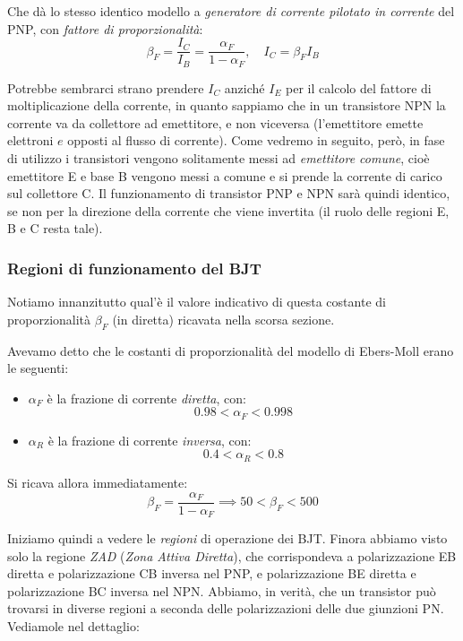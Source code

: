 \documentclass[a4paper,11pt]{article}
\begin{document}
Che dà lo stesso identico modello a \textit{generatore di corrente pilotato in corrente} del PNP, con \textit{fattore di proporzionalità}:
$$
\beta_F = \frac{I_C}{I_B} = \frac{\alpha_F}{1 - \alpha_F}, \quad I_C = \beta_F I_B
$$

Potrebbe sembrarci strano prendere $I_C$ anziché $I_E$ per il calcolo del fattore di moltiplicazione della corrente, in quanto sappiamo che in un transistore NPN la corrente va da collettore ad emettitore, e non viceversa (l'emettitore emette elettroni $e$ opposti al flusso di corrente). Come vedremo in seguito, però, in fase di utilizzo i transistori vengono solitamente messi ad \textit{emettitore comune}, cioè emettitore E e base B vengono messi a comune e si prende la corrente di carico sul collettore C. Il funzionamento di transistor PNP e NPN sarà quindi identico, se non per la direzione della corrente che viene invertita (il ruolo delle regioni E, B e C resta tale). 

\subsubsection{Regioni di funzionamento del BJT}
Notiamo innanzitutto qual'è il valore indicativo di questa costante di proporzionalità $\beta_F$ (in diretta) ricavata nella scorsa sezione. 

Avevamo detto che le costanti di proporzionalità del modello di Ebers-Moll erano le seguenti:
\begin{itemize}
	\item $\alpha_F$ è la frazione di corrente \textit{diretta}, con:
$$
0.98 < \alpha_F < 0.998
$$
	\item $\alpha_R$ è la frazione di corrente \textit{inversa}, con:
$$
0.4 < \alpha_R < 0.8
$$
\end{itemize}

Si ricava allora immediatamente:
$$
\beta_F = \frac{\alpha_F}{1 - \alpha_F} \implies 50 < \beta_F < 500
$$

Iniziamo quindi a vedere le \textit{regioni} di operazione dei BJT. Finora abbiamo visto solo la regione \textit{ZAD} (\textit{Zona Attiva Diretta}), che corrispondeva a polarizzazione EB diretta e polarizzazione CB inversa nel PNP, e polarizzazione BE diretta e polarizzazione BC inversa nel NPN. Abbiamo, in verità, che un transistor può trovarsi in diverse regioni a seconda delle polarizzazioni delle due giunzioni PN. Vediamole nel dettaglio:
\end{document}
